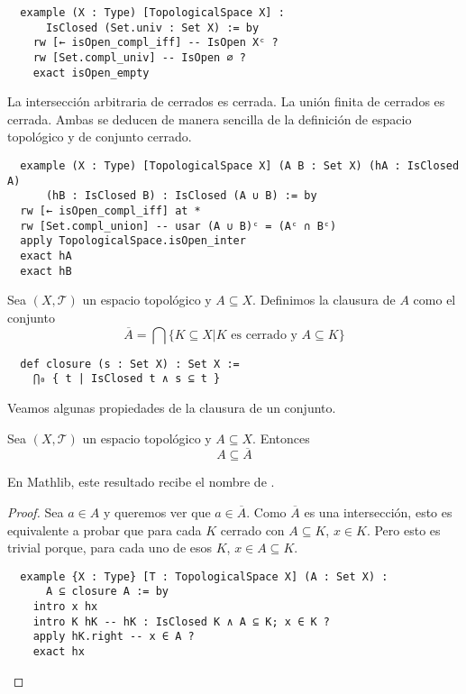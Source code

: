 \begin{lstlisting}
  example (X : Type) [TopologicalSpace X] :
      IsClosed (Set.univ : Set X) := by
    rw [← isOpen_compl_iff] -- IsOpen Xᶜ ?
    rw [Set.compl_univ] -- IsOpen ∅ ?
    exact isOpen_empty
\end{lstlisting}

\begin{example}
  La intersección arbitraria de cerrados es cerrada. La unión finita de cerrados es cerrada. Ambas se deducen de manera sencilla de la definición de espacio topológico y de conjunto cerrado.
\end{example}

\begin{lstlisting}
  example (X : Type) [TopologicalSpace X] (A B : Set X) (hA : IsClosed A)
      (hB : IsClosed B) : IsClosed (A ∪ B) := by
  rw [← isOpen_compl_iff] at *
  rw [Set.compl_union] -- usar (A ∪ B)ᶜ = (Aᶜ ∩ Bᶜ)
  apply TopologicalSpace.isOpen_inter
  exact hA
  exact hB
\end{lstlisting}

\begin{definition}
  Sea $(X, \mathcal{T})$ un espacio topológico y $A \subseteq X$. Definimos la \textnormal{clausura} de $A$ como el conjunto
  $$
  \overline{A} = \bigcap \{K \subseteq X | K \text{ es cerrado y } A \subseteq K\}
  $$
\end{definition}

\begin{lstlisting}
  def closure (s : Set X) : Set X :=
    ⋂₀ { t | IsClosed t ∧ s ⊆ t }
\end{lstlisting}

Veamos algunas propiedades de la clausura de un conjunto.

\begin{proposition}
  Sea $(X, \mathcal{T})$ un espacio topológico y $A \subseteq X$. Entonces
  $$
  A \subseteq \overline{A}
  $$
\end{proposition}

En Mathlib, este resultado recibe el nombre de .

\begin{proof}
  Sea $a \in A$ y queremos ver que $a \in \overline{A}$. Como $\overline{A}$ es una intersección, esto es equivalente a probar que para cada $K$ cerrado con $A \subseteq K$, $x \in K$. Pero esto es trivial porque, para cada uno de esos $K$, $x \in A \subseteq K$.

  \begin{lstlisting}
  example {X : Type} [T : TopologicalSpace X] (A : Set X) :
      A ⊆ closure A := by
    intro x hx
    intro K hK -- hK : IsClosed K ∧ A ⊆ K; x ∈ K ?
    apply hK.right -- x ∈ A ?
    exact hx \end{lstlisting}
\end{proof}

